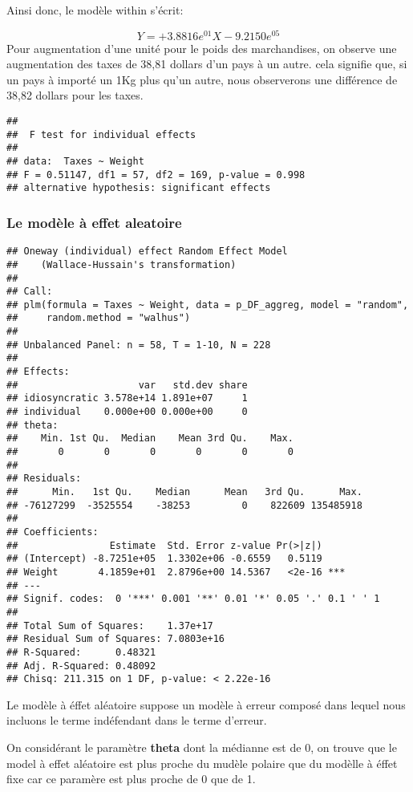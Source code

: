 \documentclass[
]{book}
\begin{document}
Ainsi donc, le modèle within s'écrit:

\[ Y = + 3.8816e^{01}X - 9.2150e^{05} \]
Pour augmentation d'une unité pour le poids des marchandises, on observe une augmentation des taxes de 38,81 dollars d'un pays à un autre. cela signifie que, si un pays à importé un 1Kg plus qu'un autre, nous observerons une différence de 38,82 dollars pour les taxes.

\begin{verbatim}
## 
##  F test for individual effects
## 
## data:  Taxes ~ Weight
## F = 0.51147, df1 = 57, df2 = 169, p-value = 0.998
## alternative hypothesis: significant effects
\end{verbatim}

\hypertarget{le-moduxe8le-uxe0-effet-aleatoire}{%
\subsubsection{Le modèle à effet aleatoire}\label{le-moduxe8le-uxe0-effet-aleatoire}}

\begin{verbatim}
## Oneway (individual) effect Random Effect Model 
##    (Wallace-Hussain's transformation)
## 
## Call:
## plm(formula = Taxes ~ Weight, data = p_DF_aggreg, model = "random", 
##     random.method = "walhus")
## 
## Unbalanced Panel: n = 58, T = 1-10, N = 228
## 
## Effects:
##                     var   std.dev share
## idiosyncratic 3.578e+14 1.891e+07     1
## individual    0.000e+00 0.000e+00     0
## theta:
##    Min. 1st Qu.  Median    Mean 3rd Qu.    Max. 
##       0       0       0       0       0       0 
## 
## Residuals:
##      Min.   1st Qu.    Median      Mean   3rd Qu.      Max. 
## -76127299  -3525554    -38253         0    822609 135485918 
## 
## Coefficients:
##                Estimate  Std. Error z-value Pr(>|z|)    
## (Intercept) -8.7251e+05  1.3302e+06 -0.6559   0.5119    
## Weight       4.1859e+01  2.8796e+00 14.5367   <2e-16 ***
## ---
## Signif. codes:  0 '***' 0.001 '**' 0.01 '*' 0.05 '.' 0.1 ' ' 1
## 
## Total Sum of Squares:    1.37e+17
## Residual Sum of Squares: 7.0803e+16
## R-Squared:      0.48321
## Adj. R-Squared: 0.48092
## Chisq: 211.315 on 1 DF, p-value: < 2.22e-16
\end{verbatim}

Le modèle à éffet aléatoire suppose un modèle à erreur composé dans lequel nous incluons le terme indéfendant dans le terme d'erreur.

On considérant le paramètre \textbf{theta} dont la médianne est de 0, on trouve que le model à effet aléatoire est plus proche du mudèle polaire que du modèlle à éffet fixe car ce paramère est plus proche de 0 que de 1.
\end{document}
